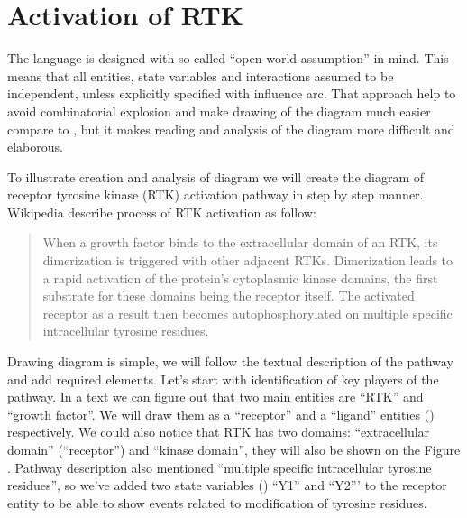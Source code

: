 \section{Activation of RTK}

The \SBGNERLone language is designed with so called ``open world assumption'' in mind. This means that all entities, state variables and interactions assumed to be independent, unless explicitly specified with influence arc. That approach help to avoid combinatorial explosion and make drawing of the diagram much easier compare to \SBGNPDLone, but it makes reading and analysis of the diagram more difficult and elaborous.  

To illustrate creation and analysis of \SBGNERLone diagram we will create the diagram of receptor tyrosine kinase (RTK) activation pathway in step by step manner. Wikipedia describe process of RTK activation as follow:
\begin{quote}
When a growth factor binds to the extracellular domain of an RTK, its dimerization is triggered with other adjacent RTKs. Dimerization leads to a rapid activation of the protein's cytoplasmic kinase domains, the first substrate for these domains being the receptor itself. The activated receptor as a result then becomes autophosphorylated on multiple specific intracellular tyrosine residues.
\end{quote}

Drawing \SBGNERLone diagram is simple, we will follow the textual description of the pathway and add required elements. Let's start with  identification of key players of the pathway. In a text we can figure out that two main entities are ``RTK'' and ``growth factor''. We will draw them as a ``receptor'' and a ``ligand''  entities () respectively. We could also notice that RTK has two domains: ``extracellular domain'' (``receptor'') and ``kinase domain'', they will also be shown on  the Figure . Pathway description also mentioned ``multiple specific intracellular tyrosine residues'', so we've added two state variables () ``Y1'' and ``Y2''' to the receptor entity to be able to show events related to modification of tyrosine residues.  

